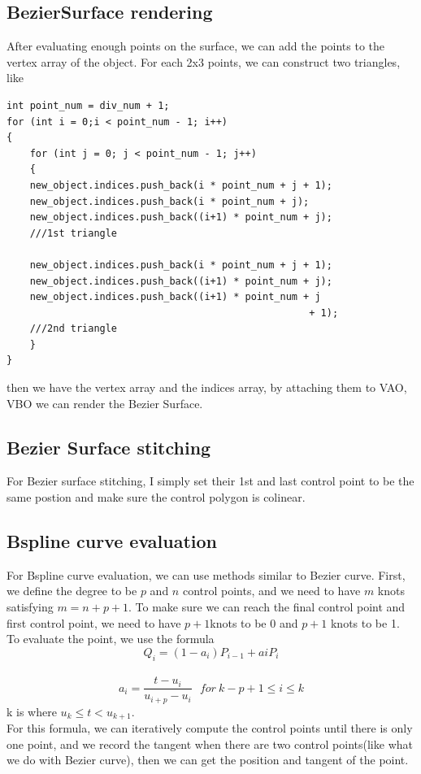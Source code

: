 \documentclass[acmtog]{acmart}
\begin{document}
\subsection{BezierSurface rendering}
After evaluating enough points on the surface, we can add the points to the vertex array of the object.
For each 2x3 points, we can construct two triangles, like

\begin{lstlisting}
int point_num = div_num + 1;
for (int i = 0;i < point_num - 1; i++)
{
	for (int j = 0; j < point_num - 1; j++)
	{
	new_object.indices.push_back(i * point_num + j + 1);
	new_object.indices.push_back(i * point_num + j);
	new_object.indices.push_back((i+1) * point_num + j);
	///1st triangle

	new_object.indices.push_back(i * point_num + j + 1);
	new_object.indices.push_back((i+1) * point_num + j);
	new_object.indices.push_back((i+1) * point_num + j 
													+ 1);
	///2nd triangle
	}
}
\end{lstlisting}
then we have the vertex array and the indices array, by attaching them to VAO, VBO
we can render the Bezier Surface.
\subsection{Bezier Surface stitching}
For Bezier surface stitching, I simply set their 1st and last control point to be the same postion and make sure the control polygon is colinear.

\subsection{Bspline curve evaluation}
For Bspline curve evaluation, we can use methods similar to Bezier curve. First, we define the degree to be $p$ and $n$ control points, and we need 
to have $m$ knots satisfying $m = n + p + 1$. To make sure we can reach the final control point and first control point, we need to have $p + 1$knots to be 0 and 
$p + 1$ knots to be 1.\\
To evaluate the point, we use the formula
$$Q_i = (1 - a_i)P_{i-1} + aiP_i$$
\\
$$a_i = \frac{t-u_i}{u_{i+p} - u_i} \ \ \ for\ k -p+1 \leq i \leq k$$
k is where $u_k \leq t < u_{k+1}$.\\
For this formula, we can iteratively compute the control points until there is only one  point, and we record the tangent when there are two 
control points(like what we do with Bezier curve), then we can get the position and tangent of the point.
\end{document}

